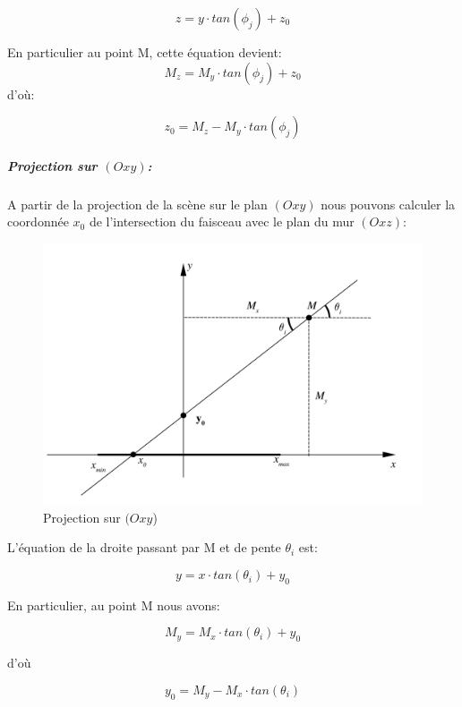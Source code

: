 \documentclass[12pt,a4paper]{report}
\begin{document}
\begin{equation}
	z = y \cdot tan(\phi_j) + z_0
	\label{zytanphi}
\end{equation}

En particulier au point M, cette équation devient:
\begin{equation}
	M_z = M_y \cdot tan(\phi_j) + z_0
\end{equation}
 d'où:
 
\begin{equation}
\boxed{
	z_0 = M_z - M_y \cdot tan(\phi_j)
}
\label{z0}
\end{equation}



\subparagraph{Projection sur $(Oxy)$:}

A partir de la projection de la scène sur le plan $(Oxy)$ nous pouvons calculer la coordonnée $x_0$ de l'intersection du faisceau avec le plan du mur $(Oxz)$:

\begin{figure}[H]
	\centering
	\includegraphics[width=0.8\linewidth]{img/ProjOxyX0}
	\caption{Projection sur $(Oxy$)}
	\label{fig:projoxyx0}
\end{figure}

L'équation de la droite passant par M et de pente $\theta_i$ est:

\begin{equation}
	y = x \cdot tan(\theta_i) + y_0
	\label{yxtantheta_i}
\end{equation}

En particulier, au point M nous avons:

\begin{equation}
	M_y = M_x \cdot tan(\theta_i) + y_0 
\end{equation}

d'où

\begin{equation}
	y_0 = M_y - M_x \cdot tan(\theta_i)
\end{equation}
\end{document}
